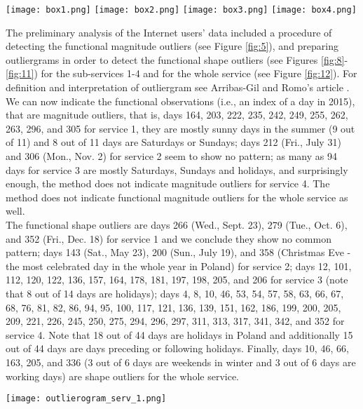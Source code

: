 \documentclass[12pt,a4paper]{article}
\numberwithin{equation}{section}
\begin{document}
\begin{figure*}
\texttt{[image: box1.png]}
\texttt{[image: box2.png]}
\texttt{[image: box3.png]}
\texttt{[image: box4.png]}
\caption{Functional boxplots of number of four sub-services users, \textit{DepthProc} R package.}
\label{fig:5}
\end{figure*}
 The preliminary analysis of the Internet users' data included a procedure of detecting the functional magnitude outliers (see Figure \ref{fig:5}), and preparing outliergrams in order to detect the functional shape outliers (see Figures \ref{fig:8}-\ref{fig:11}) for the sub-services 1-4 and for the whole service (see Figure \ref{fig:12}). For definition and interpretation of outliergram see Arribas-Gil and Romo's article \cite{Arribas}. We can now indicate the functional observations (i.e., an index of a day in 2015), that are magnitude outliers, that is, days 164, 203, 222, 235, 242, 249, 255, 262, 263, 296, and 305 for service 1, they are mostly sunny days in the summer (9 out of 11) and 8 out of 11 days are Saturdays or Sundays; days 212 (Fri., July 31) and 306 (Mon., Nov. 2) for service 2 seem to show no pattern; as many as 94 days for service 3 are mostly Saturdays, Sundays and holidays, and surprisingly enough, the method does not indicate magnitude outliers for service 4. The method does not indicate functional magnitude outliers for the whole service as well.
\\ The functional shape outliers are days 266 (Wed., Sept. 23), 279 (Tue., Oct. 6), and 352 (Fri., Dec. 18) for service 1 and we conclude they show no common pattern; days 143 (Sat., May 23), 200 (Sun., July 19), and 358 (Christmas Eve - the most celebrated day in the whole year in Poland) for service 2; days 12, 101, 112, 120, 122, 136, 157, 164, 178, 181, 197, 198, 205, and 206 for service 3 (note that 8 out of 14 days are holidays); days 4, 8, 10, 46, 53, 54, 57, 58, 63, 66, 67, 68, 76, 81, 82, 86, 94, 95, 100, 117, 121, 136, 139, 151, 162, 186, 199, 200, 205, 209, 221, 226, 245, 250, 275, 294, 296, 297, 311, 313, 317, 341, 342, and 352 for service 4. Note that 18 out of 44 days are holidays in Poland and additionally 15 out of 44 days are days preceding or following holidays. Finally, days 10, 46, 66, 163, 205, and 336  (3 out of 6 days are weekends in winter and 3 out of 6 days are working days) are shape outliers for the whole service.
\begin{figure*}
\texttt{[image: outlierogram\_serv\_1.png]}
\caption{Shape outliers and an outliergram for  service 1, \textit{roahd} R package.}
\label{fig:8}
\end{figure*}
\end{document}
